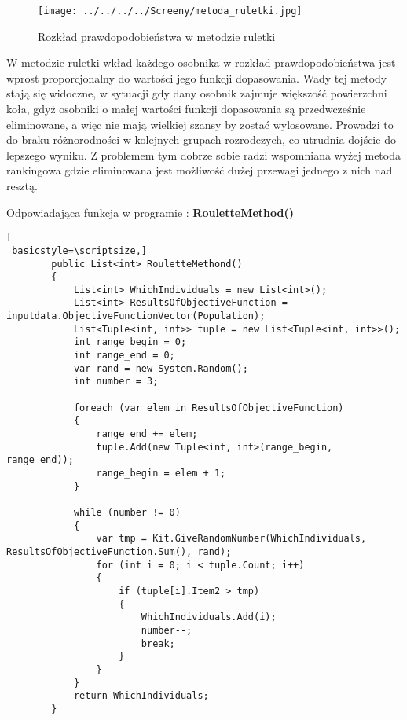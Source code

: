\begin{figure}[h]
		\texttt{[image: ../../../../Screeny/metoda\_ruletki.jpg]}
		\caption{Rozkład prawdopodobieństwa w metodzie ruletki}
		\label{ruletka}			
\end{figure}
\par
W metodzie ruletki wkład każdego osobnika w rozkład prawdopodobieństwa jest wprost proporcjonalny do wartości jego funkcji dopasowania. Wady tej metody stają się widoczne, w sytuacji gdy dany osobnik zajmuje większość powierzchni koła, gdyż osobniki o małej wartości funkcji dopasowania są przedwcześnie eliminowane, a więc nie mają wielkiej szansy by zostać wylosowane. Prowadzi to do braku różnorodności w kolejnych grupach rozrodczych, co utrudnia dojście do lepszego wyniku. Z problemem tym dobrze sobie radzi wspomniana wyżej metoda rankingowa gdzie eliminowana jest możliwość dużej przewagi jednego z nich nad resztą.\\
\par
Odpowiadająca funkcja w programie : \textbf{RouletteMethod()}

\begin{program}
\begin{lstlisting}[
 basicstyle=\scriptsize,]
        public List<int> RouletteMethond()
        {
            List<int> WhichIndividuals = new List<int>();
            List<int> ResultsOfObjectiveFunction = inputdata.ObjectiveFunctionVector(Population);
            List<Tuple<int, int>> tuple = new List<Tuple<int, int>>();
            int range_begin = 0;
            int range_end = 0;
            var rand = new System.Random();
            int number = 3;

            foreach (var elem in ResultsOfObjectiveFunction)
            {
                range_end += elem;
                tuple.Add(new Tuple<int, int>(range_begin, range_end));
                range_begin = elem + 1;
            }

            while (number != 0)
            {
                var tmp = Kit.GiveRandomNumber(WhichIndividuals, ResultsOfObjectiveFunction.Sum(), rand);
                for (int i = 0; i < tuple.Count; i++)
                {
                    if (tuple[i].Item2 > tmp)
                    {
                        WhichIndividuals.Add(i);
                        number--;
                        break;
                    }
                }
            }
            return WhichIndividuals;
        }
\end{lstlisting}
\end{program}

